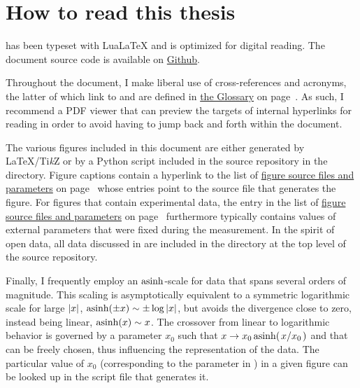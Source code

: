 \chapter*{How to read this thesis}

\Thethesis has been typeset with Lua\LaTeX{} and is optimized for digital reading.
The document source code is available on \href{https://github.com/thangleiter/phd_thesis/}{Github}.

Throughout the document, I make liberal use of cross-references and acronyms, the latter of which link to and are defined in \hyperref[glo]{the Glossary} on page~\pageref{glo}.
As such, I recommend a PDF viewer that can preview the targets of internal hyperlinks for reading \thethesis in order to avoid having to jump back and forth within the document.

The various figures included in this document are either generated by \LaTeX{}/Ti\emph{k}Z or by a Python script included in the source repository in the  directory.
Figure captions contain a hyperlink to the list of \hyperref[lof]{figure source files and parameters} on page~\pageref{lof} whose entries point to the source file that generates the figure.
For figures that contain experimental data, the entry in the list of \hyperref[lof]{figure source files and parameters} on page~\pageref{lof} furthermore typically contains values of external parameters that were fixed during the measurement.
In the spirit of open data, all data discussed in \thethesis are included in the  directory at the top level of the source repository.

Finally, I frequently employ an $\operatorname{asinh}$-scale for data that spans several orders of magnitude.
This scaling is asymptotically equivalent to a symmetric logarithmic scale for large $\abs{x}$, $\operatorname{asinh}(\pm x)\sim\pm\log\abs{x}$, but avoids the divergence close to zero, instead being linear, $\operatorname{asinh}(x)\sim x$.
The crossover from linear to logarithmic behavior is governed by a parameter $x_0$ such that $x\to x_0\asinh(\flatfrac{x}{x_0})$ and that can be freely chosen, thus influencing the representation of the data.
The particular value of $x_0$ (corresponding to the  parameter in \href{https://matplotlib.org/stable/gallery/scales/asinh_demo.html}{\matplotlib}) in a given figure can be looked up in the script file that generates it.
